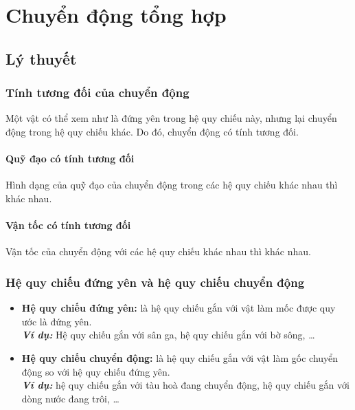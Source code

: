 \let\lesson\undefined
\newcommand{\lesson}{\phantomlesson{Bài 5: Chuyển động tổng hợp}}
\chapter[Chuyển động tổng hợp]{Chuyển động tổng hợp}
\setcounter{section}{0}
\section{Lý thuyết}
\subsection{Tính tương đối của chuyển động}
Một vật có thể xem như là đứng yên trong hệ quy chiếu này, nhưng lại chuyển động trong hệ quy chiếu khác. Do đó, chuyển động có tính tương đối.
\subsubsection{Quỹ đạo có tính tương đối}
Hình dạng của quỹ đạo của chuyển động trong các hệ quy chiếu khác nhau thì khác nhau. 
\subsubsection{Vận tốc có tính tương đối}
Vận tốc của chuyển động với các hệ quy chiếu khác nhau thì khác nhau. 
\subsection{Hệ quy chiếu đứng yên và hệ quy chiếu chuyển động}
\begin{itemize}
	\item \textbf{Hệ quy chiếu đứng yên:} là hệ quy chiếu gắn với vật làm mốc được quy ước là đứng yên.\\
	\textit{\textbf{Ví dụ:}} Hệ quy chiếu gắn với sân ga, hệ quy chiếu gắn với bờ sông, \dots
	\item \textbf{Hệ quy chiếu chuyển động:} là hệ quy chiếu gắn với vật làm gốc chuyển động so với hệ quy chiếu đứng yên.\\
	\textit{\textbf{Ví dụ:}} hệ quy chiếu gắn với tàu hoà đang chuyển động, hệ quy chiếu gắn với dòng nước đang trôi, \dots
\end{itemize}
